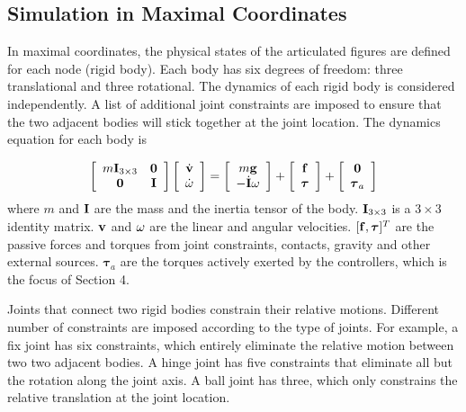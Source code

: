 \subsection{Simulation in Maximal Coordinates}

In maximal coordinates, the physical states of the articulated figures are defined for each node (rigid body). Each body has six degrees of freedom: three translational and three rotational. The dynamics of each rigid body is considered independently. A list of additional joint constraints are imposed to ensure that the two adjacent bodies will stick together at the joint location. The dynamics equation for each body is 

\begin{equation}
\left[\begin{array}{cc}
m\vc{I}_{3\times3} & \vc{0} \\
\vc{0} & \vc{I}
\end{array}\right]
\left[\begin{array}{c}
\dot{\vc{v}} \\
\dot{\vc{\omega}}
\end{array}\right]=
\left[\begin{array}{c}
m\vc{g} \\
-\dot{\vc{I}}\vc{\omega}
\end{array}\right]
+\left[\begin{array}{c}
\vc{f}\\
\boldsymbol{\tau}
\end{array}\right]
+
\left[\begin{array}{c}
\vc{0}\\
\boldsymbol{\tau}_a
\end{array}\right]
\label{eq:dynamics}
\end{equation}
where $m$ and $\mathbf{I}$ are the mass and the inertia tensor of the body. $\mathbf{I}_{3\times 3}$ is a $3\times 3$ identity matrix. $\mathbf{v}$ and $\mathbf{\omega}$ are the linear and angular velocities. $[\mathbf{f}, \boldsymbol{\tau}]^T$ are the passive forces and torques from joint constraints, contacts, gravity and other external sources. $\boldsymbol{\tau}_a$ are the torques actively exerted by the controllers, which is the focus of Section 4.

Joints that connect two rigid bodies constrain their relative motions. Different number of constraints are imposed according to the type of joints. For example, a fix joint has six constraints, which entirely eliminate the relative motion between two two adjacent bodies. A hinge joint has five constraints that eliminate all but the rotation along the joint axis. A ball joint has three, which only constrains the relative translation at the joint location. 

